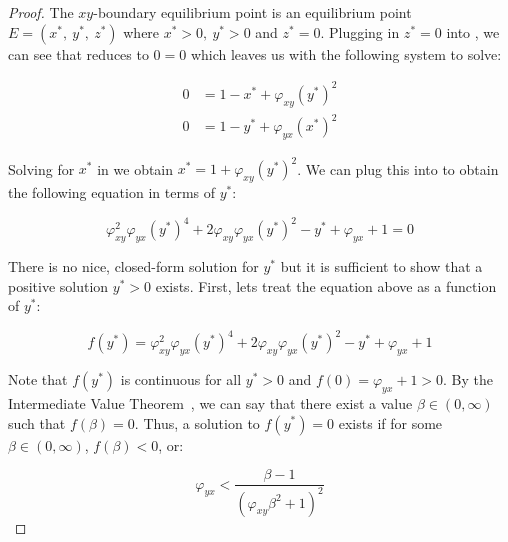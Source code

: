 \begin{proof}
    The $xy$-boundary equilibrium point is an equilibrium point $E=\left(x^*,\ y^*,\ z^*\right)$ where $x^*>0,\ y^*>0$ and $z^*=0$. Plugging in $z^*=0$ into , we can see that  reduces to $0=0$ which leaves us with the following system to solve:

    \begin{subequations}\label{system:xy-boundary}
        \begin{align}
            0 &= 1-x^*+\varphi_{xy}\left(y^*\right)^2 \label{eq:xy-boundary-x}\\
            0 &= 1-y^*+\varphi_{yx}\left(x^*\right)^2 \label{eq:xy-boundary-y}
        \end{align}
    \end{subequations}

    Solving for $x^*$ in  we obtain $x^*=1+\varphi_{xy}\left(y^*\right)^2$. We can plug this into  to obtain the following equation in terms of $y^*$:

    \begin{equation*}
        \varphi_{xy}^2\varphi_{yx}\left(y^*\right)^4+2\varphi_{xy}\varphi_{yx}\left(y^*\right)^2-y^*+\varphi_{yx}+1=0
    \end{equation*}

    There is no nice, closed-form solution for $y^*$ but it is sufficient to show that a positive solution $y^*>0$ exists. First, lets treat the equation above as a function of $y^*$:

    \begin{equation*}
        f\left(y^*\right)=\varphi_{xy}^2\varphi_{yx}\left(y^*\right)^4+2\varphi_{xy}\varphi_{yx}\left(y^*\right)^2-y^*+\varphi_{yx}+1
    \end{equation*}

    Note that $f\left(y^*\right)$ is continuous for all $y^*>0$ and $f(0)=\varphi_{yx}+1>0$. By the Intermediate Value Theorem~\cite{STEWART9781337613927}, we can say that there exist a value $\beta\in\left(0,\infty\right)$ such that $f(\beta)=0$. Thus, a solution to $f\left(y^*\right)=0$ exists if for some $\beta\in\left(0,\infty\right)$, $f\left(\beta\right)<0$, or:

    \begin{equation}\label{eq:xy-eq-condition}
        \varphi_{yx}<\frac{\beta-1}{\left(\varphi_{xy}\beta^2+1\right)^2}
    \end{equation}


\end{proof}
